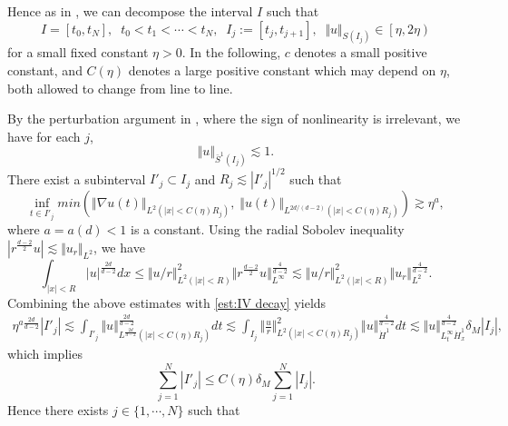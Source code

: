 \documentclass[reqno, 11pt]{amsart}
\numberwithin{equation}{section}
\theoremstyle{plain}
\theoremstyle{definition}
\numberwithin{equation}{section}
\numberwithin{theorem}{section}
\numberwithin{equation}{section}
\numberwithin{equation}{section}
\numberwithin{theorem}{section}
\begin{document}
	Hence as in \cite{Bourg,MXZ:crit Hart:def rad}, we can decompose the interval $I$ such that 
	\begin{equation*}
	I=[t_0,t_N],\;\; t_0 <t_1 <\cdots<t_N,\;\; I_j:=[t_j,t_{j+1}],\;\; \Vert u \Vert_{S(I_j)}\in \left[\eta,2\eta \right)
	\end{equation*}
	for a small fixed constant $\eta>0$. In the following, $c$ denotes a small positive constant, and $C(\eta)$ denotes a large positive constant which may depend on $\eta$, both allowed to change from line to line.
	
	By the perturbation argument in \cite[lemma 5.1]{MXZ:crit Hart:def rad}, where the sign of nonlinearity is irrelevant, we have for each $j$, 
	\begin{equation*}
	\Vert u \Vert_{\bar{S}^1(I_j)}\lesssim 1.
	\end{equation*} 
	There exist a subinterval $I'_{j}\subset I_j$ and $R_j \lesssim |I'_{j}|^{1/2}$ such that
	\begin{equation*}
	\inf_{t\in I'_{j}}min\left( \Vert \nabla u(t) \Vert_{L^2\left( |x|<C(\eta)R_j \right)} ,\; \Vert u(t) \Vert_{L^{2d/(d-2)}\left( |x|<C(\eta)R_j \right)} \right) \gtrsim \eta^{a},
	\end{equation*} 
	where $a=a(d)<1$ is a constant.
	Using the radial Sobolev inequality  $|r^{\frac{d-2}{2}}u|\lesssim \Vert u_r \Vert_{L^2}$, we have
	\begin{equation*}
	\int_{|x|<R} |u|^{\frac{2d}{d-2}} dx\leq \Vert u/r \Vert_{L^2(|x|<R)}^2 \Vert r^{\frac{d-2}{2}}u \Vert_{L^{\infty}}^{\frac{4}{d-2}}\lesssim  \Vert u/r \Vert_{L^2(|x|<R)}^2 \Vert u_r \Vert_{L^2}^{\frac{4}{d-2}}.
	\end{equation*}
	Combining the above estimates with \eqref{est:IV decay} yields 
	\begin{equation*}
	\begin{aligned}
	\eta^{a\frac{2d}{d-2}}|I'_{j}|\lesssim \int_{I'_{j}}\Vert u \Vert_{L^{\frac{2d}{d-2} }\left( |x|<C(\eta)R_j \right)}^{\frac{2d}{d-2}}dt \lesssim \int_{I_j} \Vert \frac{u}{r} \Vert_{L^2(|x|<C(\eta)R_j)}^2 \Vert u \Vert_{\dot H^1}^{\frac{4}{d-2}}dt \lesssim \Vert u \Vert_{L_t^{\infty}\dot H_x^1}^{\frac{4}{d-2}} \delta_{M}|I_j|,
	\end{aligned}
	\end{equation*}
	which implies
	\begin{equation*}
	\sum_{j=1}^{N}|I'_{j}|\leq C(\eta)\delta_{M} \sum_{j=1}^{N} |I_j|.
	\end{equation*}
	Hence there exists $j\in \{1,\cdots,N \}$ such that
\end{document}
